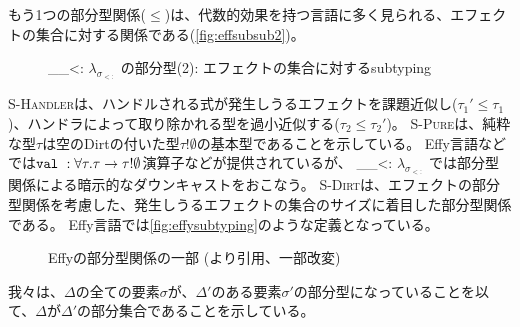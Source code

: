 \documentclass{ltjsarticle}
\def\effsub{
  \ifmmode
    \lambda_{\sigma_{<:}}
  \else
    $\lambda_{\sigma_{<:}}$
  \fi
}
\begin{document}
もう1つの部分型関係($\leqslant$)は、代数的効果を持つ言語に多く見られる、エフェクトの集合に対する関係である(\autoref{fig:effsubsub2})。
\begin{figure}[ht]
  \centering
  \begin{framed}
    \begin{multicols}{3}


      \infax[S-Pure]{
        \overline{\tau!\emptyset \leqslant \tau}
      }
    \end{multicols} 
    \vspace{0.4\baselineskip}

  \end{framed}
  \caption{\effsub{}の部分型(2): エフェクトの集合に対するsubtyping}
  \label{fig:effsubsub2}
\end{figure}
\textsc{S-Handler}は、ハンドルされる式が発生しうるエフェクトを課題近似し($\tau_1'\leqslant\tau_1$)、ハンドラによって取り除かれる型を過小近似する($\tau_2\leqslant\tau_2'$)。
\textsc{S-Pure}は、純粋な型$\tau$は空のDirtの付いた型$\tau!\emptyset$の基本型であることを示している。
Effy言語などでは$\valK : \forall \tau. \tau \rightarrow \tau!\emptyset$演算子などが提供されているが、\effsub{}では部分型関係による暗示的なダウンキャストをおこなう。
\textsc{S-Dirt}は、エフェクトの部分型関係を考慮した、発生しうるエフェクトの集合のサイズに着目した部分型関係である。
Effy言語では\autoref{fig:effysubtyping}のような定義となっている。
\begin{figure}[ht]
  \centering
  \framed
  \endframed
  \caption{Effyの部分型関係の一部 (\cite{pretnar2017efficient}より引用、一部改変)}
  \label{fig:effysubtyping}
\end{figure}
我々は、$\Delta$の全ての要素$\sigma$が、$\Delta'$のある要素$\sigma'$の部分型になっていることを以て、$\Delta$が$\Delta'$の部分集合であることを示している。
\end{document}
